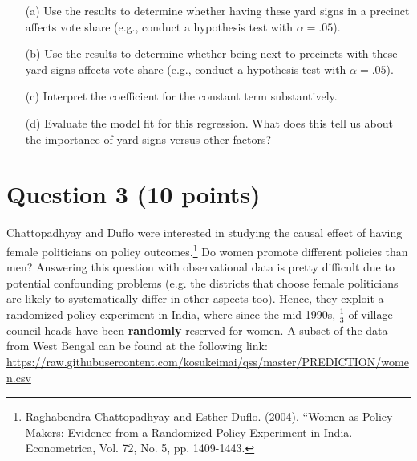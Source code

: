 \documentclass[12pt,letterpaper]{article}
\begin{document}
\begin{enumerate}
	\item [(a)] Use the results to determine whether having these yard signs in a precinct affects vote share (e.g., conduct a hypothesis test with $\alpha = .05$).

\newpage		
		\item [(b)]  Use the results to determine whether being
		next to precincts with these yard signs affects vote
		share (e.g., conduct a hypothesis test with $\alpha = .05$).
		
		\vspace{7cm}
	\item [(c)] Interpret the coefficient for the constant term substantively.
		\vspace{7cm}

	\item [(d)] Evaluate the model fit for this regression.  What does this
	tell us about the importance of yard signs versus other factors?

\end{enumerate}  
	
\newpage
	\section*{Question 3 (10 points)}
		
Chattopadhyay and Duflo were interested in studying the causal effect of having female politicians on policy outcomes.\footnote{Raghabendra Chattopadhyay and Esther Duflo. (2004). ``Women as Policy Makers: Evidence from a Randomized Policy Experiment in India. Econometrica, Vol. 72, No. 5, pp. 1409-1443.} Do women promote different policies than men? Answering this question with observational data is pretty difficult due to potential confounding problems (e.g. the districts that choose female politicians are likely to systematically differ in other aspects too). Hence, they exploit a randomized policy experiment in India, where since the mid-1990s, $\frac{1}{3}$ of village council heads have been {\bf{randomly}} reserved for women. A subset of the data from West Bengal can be found at the following link: \url{https://raw.githubusercontent.com/kosukeimai/qss/master/PREDICTION/women.csv}\\
\end{document}
